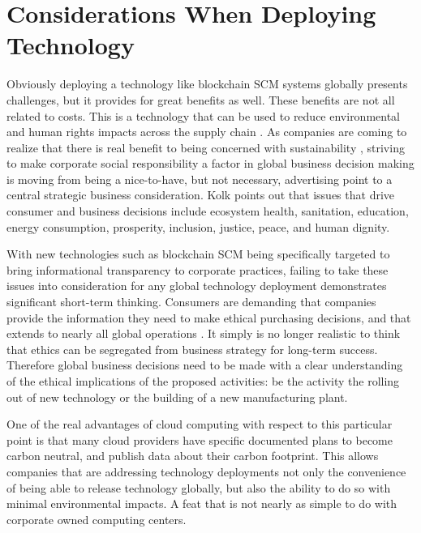 \section{Considerations When Deploying Technology}

Obviously deploying a technology like blockchain SCM systems globally presents challenges, but it provides for great benefits as well. These benefits are not all related to costs. This is a technology that can be used to reduce environmental and human rights impacts across the supply chain \parencite{mukherjeeApplicationBlockchainTechnology2021}. As companies are coming to realize that there is real benefit to being concerned with sustainability \parencite{kolkSocialResponsibilityInternational2016}, striving to make corporate social responsibility a factor in global business decision making is moving from being a nice-to-have, but not necessary, advertising point to a central strategic business consideration. Kolk points out that issues that drive consumer and business decisions include ecosystem health, sanitation, education, energy consumption, prosperity, inclusion, justice, peace, and human dignity.

With new technologies such as blockchain SCM being specifically targeted to bring informational transparency to corporate practices, failing to take these issues into consideration for any global technology deployment demonstrates significant short-term thinking. Consumers are demanding that companies provide the information they need to make ethical purchasing decisions, and that extends to nearly all global operations \parencite{saberiBlockchainTechnologyIts2019,sahaiEnablingPrivacyTraceability2020,kimProcessModelCorporate2019}. It simply is no longer realistic to think that ethics can be segregated from business strategy for long-term success. Therefore global business decisions need to be made with a clear understanding of the ethical implications of the proposed activities: be the activity the rolling out of new technology or the building of a new manufacturing plant.

One of the real advantages of cloud computing with respect to this particular point is that many cloud providers have specific documented plans to become carbon neutral, and publish data about their carbon footprint. This allows companies that are addressing technology deployments not only the convenience of being able to release technology globally, but also the ability to do so with minimal environmental impacts. A feat that is not nearly as simple to do with corporate owned computing centers.
